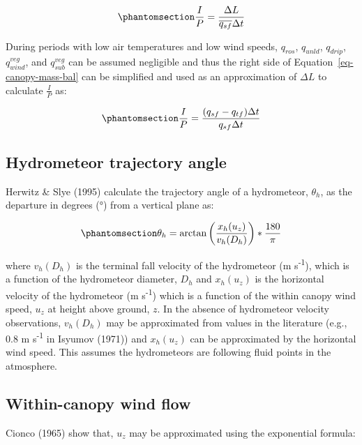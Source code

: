 \documentclass[
  letterpaper,
  DIV=11,
  numbers=noendperiod]{scrartcl}
\begin{document}
\begin{equation}\phantomsection\label{eq-ip}{
\frac{I}{P} = \frac{\Delta L}{\overline{q_{sf}} \Delta t}
}\end{equation}

During periods with low air temperatures and low wind speeds,
\(q_{ros}\), \(q_{unld}\), \(q_{drip}\), \(q_{wind}^{veg}\), and
\(q_{sub}^{veg}\) can be assumed negligible and thus the right side of
Equation~\ref{eq-canopy-mass-bal} can be simplified and used as an
approximation of \(\Delta L\) to calculate \(\frac{I}{P}\) as:

\begin{equation}\phantomsection\label{eq-ip2}{
\frac{I}{P} = \frac{(q_{sf} - q_{tf})\Delta t}{q_{sf} \Delta t}
}\end{equation}

\subsection{Hydrometeor trajectory
angle}\label{hydrometeor-trajectory-angle}

Herwitz \& Slye (1995) calculate the trajectory angle of a hydrometeor,
\(\theta_h\), as the departure in degrees (°) from a vertical plane as:

\begin{equation}\phantomsection\label{eq-ta}{
\theta_h = \arctan \left(\frac{x_h(u_z)}{v_h(D_h)}\right)*\frac{180}{\pi}
}\end{equation}

where \(v_h(D_h)\) is the terminal fall velocity of the hydrometeor (m
s\textsuperscript{-1}), which is a function of the hydrometeor diameter,
\(D_h\) and \(x_h(u_z)\) is the horizontal velocity of the hydrometeor
(m s\textsuperscript{-1}) which is a function of the within canopy wind
speed, \(u_z\) at height above ground, \(z\). In the absence of
hydrometeor velocity observations, \(v_h(D_h)\) may be approximated from
values in the literature (e.g., 0.8 m s\textsuperscript{-1} in Isyumov
(1971)) and \(x_h(u_z)\) can be approximated by the horizontal wind
speed. This assumes the hydrometeors are following fluid points in the
atmosphere.

\subsection{Within-canopy wind flow}\label{within-canopy-wind-flow}

Cionco (1965) show that, \(u_z\) may be approximated using the
exponential formula:
\end{document}
